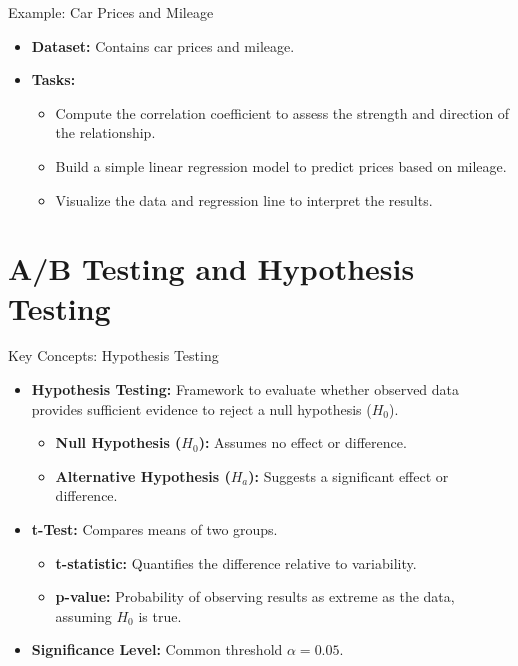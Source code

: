 \documentclass{beamer}
\begin{document}
\begin{frame}{Example: Car Prices and Mileage}
\begin{itemize}
    \item \textbf{Dataset:} Contains car prices and mileage.
    \item \textbf{Tasks:}
    \begin{itemize}
        \item Compute the correlation coefficient to assess the strength and direction of the relationship.
        \item Build a simple linear regression model to predict prices based on mileage.
        \item Visualize the data and regression line to interpret the results.
    \end{itemize}
\end{itemize}
\end{frame}

\section{A/B Testing and Hypothesis Testing}

\begin{frame}{Key Concepts: Hypothesis Testing}
\begin{itemize}
    \item \textbf{Hypothesis Testing:} Framework to evaluate whether observed data provides sufficient evidence to reject a null hypothesis ($H_0$).
    \begin{itemize}
        \item \textbf{Null Hypothesis ($H_0$):} Assumes no effect or difference.
        \item \textbf{Alternative Hypothesis ($H_a$):} Suggests a significant effect or difference.
    \end{itemize}
    \item \textbf{t-Test:} Compares means of two groups.
    \begin{itemize}
        \item \textbf{t-statistic:} Quantifies the difference relative to variability.
        \item \textbf{p-value:} Probability of observing results as extreme as the data, assuming $H_0$ is true.
    \end{itemize}
    \item \textbf{Significance Level:} Common threshold $\alpha = 0.05$.
\end{itemize}
\end{frame}
\end{document}
